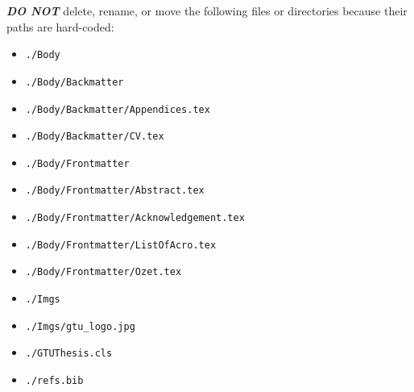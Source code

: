 \textbf{\textit{DO NOT}} delete, rename, or move the following files or directories because their paths are hard-coded:
\begin{itemize}
    \item \texttt{./Body}
    \item \texttt{./Body/Backmatter}
    \item \texttt{./Body/Backmatter/Appendices.tex}
    \item \texttt{./Body/Backmatter/CV.tex}
    \item \texttt{./Body/Frontmatter}
    \item \texttt{./Body/Frontmatter/Abstract.tex}
    \item \texttt{./Body/Frontmatter/Acknowledgement.tex}
    \item \texttt{./Body/Frontmatter/ListOfAcro.tex}
    \item \texttt{./Body/Frontmatter/Ozet.tex}
    \item \texttt{./Imgs}
    \item \texttt{./Imgs/gtu\_logo.jpg}
    \item \texttt{./GTUThesis.cls}
    \item \texttt{./refs.bib}
\end{itemize}